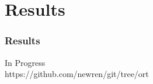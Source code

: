 \documentclass[compress,t]{beamer}
\begin{document}
\section[Results]{Results}

\begin{frame}
  \frametitle{Results}

  \vfill
  \begin{center}
    In Progress\\[2em]

    https://github.com/newren/git/tree/ort
  \end{center}
  \vfill

\end{frame}
\end{document}
